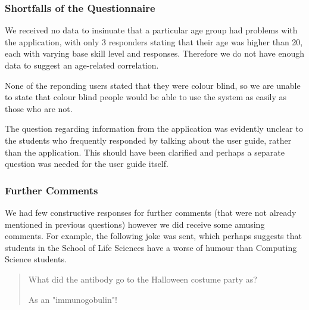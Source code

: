 \subsubsection{Shortfalls of the Questionnaire}
We received no data to insinuate that a particular age group had
problems with the application, with only 3 responders stating that
their age was higher than 20, each with varying base skill level and
responses.
Therefore we do not have enough data to suggest an age-related
correlation.

None of the reponding users stated that they were colour blind, so we
are unable to state that colour blind people would be able to use the
system as easily as those who are not.

The question regarding information from the application was evidently
unclear to the students who frequently responded by talking about the
user guide, rather than the application.
This should have been clarified and perhaps a separate question was
needed for the user guide itself.

\subsubsection{Further Comments}

We had few constructive responses for further comments (that were not
already mentioned in previous questions) however we did receive some
amusing comments.
For example, the following joke was sent, which perhaps suggests that
students in the School of Life Sciences have a worse of humour than
Computing Science students.
\begin{quote}
What did the antibody go to the Halloween costume party as?

As an "immunogobulin"!
\end{quote}


